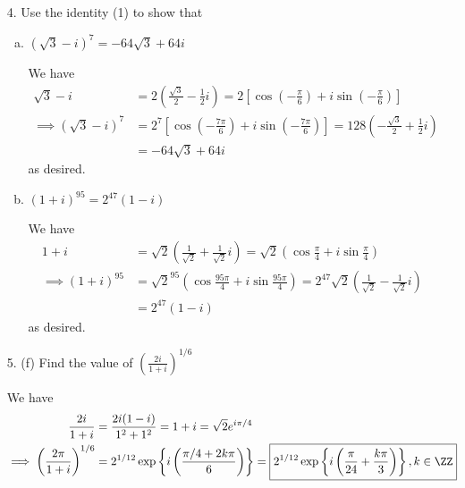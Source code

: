 \documentclass{article}
\begin{document}
\begin{itemize}
	\item[4.] Use the identity (1) to show that
		\begin{enumerate}[(a)]
			\item $(\sqrt{3}-i)^7=-64\sqrt{3}+64i$
				\begin{soln}
					We have
					\begin{align*}
						\sqrt{3}-i &= 2\left( \frac{\sqrt{3}}{2} - \frac{1}{2}i \right) = 2\left[ \cos\left( -\frac{\pi}{6} \right) + i\sin\left( -\frac{\pi}{6} \right) \right] \\
						\implies \left( \sqrt{3}-i \right)^7 &= 2^7 \left[ \cos \left( -\frac{7\pi}{6} \right) + i\sin\left( -\frac{7\pi}{6} \right) \right] = 128\left( -\frac{\sqrt{3}}{2} + \frac{1}{2}i \right) \\
						&= -64\sqrt{3} + 64i
					\end{align*}
					as desired.
				\end{soln}

			\item $(1+i)^{95}=2^{47}(1-i)$
				\begin{soln}
					We have
					\begin{align*}
						1+i &= \sqrt{2}\left( \frac{1}{\sqrt{2}} + \frac{1}{\sqrt{2}}i \right) = \sqrt{2}\left( \cos\frac{\pi}{4} + i\sin\frac{\pi}{4} \right) \\
						\implies (1+i)^{95} &= \sqrt{2}^{95}\left( \cos \frac{95\pi}{4} + i\sin\frac{95\pi}{4} \right) = 2^{47}\sqrt{2}\left( \frac{1}{\sqrt{2}} - \frac{1}{\sqrt{2}}i \right) \\
						&= 2^{47}(1-i)
					\end{align*}
					as desired.
				\end{soln}
				
		\end{enumerate}

	\item[5.] (f) Find the value of $\left( \frac{2i}{1+i} \right)^{1/6}$
		\begin{soln}
			We have
			\begin{align*}
				\frac{2i}{1+i} &= \frac{2i(1-i)}{1^2+1^2} = 1 + i = \sqrt{2}e^{i\pi/4} \\
				\implies \left( \frac{2\pi}{1+i} \right)^{1/6} &= 2^{1/12} \exp\left\{ i\left( \frac{\pi/4+2k\pi}{6}\right) \right\} = \boxed{2^{1/12}\exp\left\{ i\left( \frac{\pi}{24} + \frac{k\pi}{3} \right) \right\}, k\in\ZZ}
			\end{align*}
		\end{soln}

\end{itemize}
\end{document}
